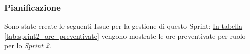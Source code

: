 \subsubsection{Pianificazione}

Sono state create le seguenti Issue per la gestione di questo Sprint: 
\hyperref[tab:sprint2_ore_preventivate]{In tabella \ref{tab:sprint2_ore_preventivate}} vengono mostrate le ore preventivate per ruolo per lo \textit{Sprint 2}.

\begin{table}[!h]
    \centering
    \caption{Ore preventivate per ruolo Sprint 2}
    \label{tab:sprint2_ore_preventivate}
\end{table}